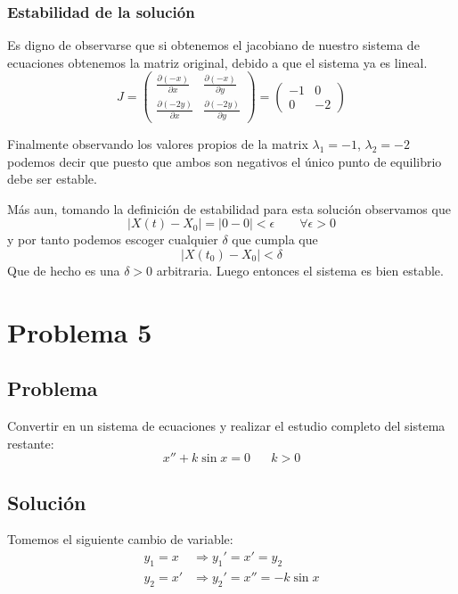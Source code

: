 \documentclass[10pt,letterpaper,titlepage]{article}
\begin{document}
\subsubsection{Estabilidad de la soluci\'on}

Es digno de observarse que si obtenemos el jacobiano de nuestro sistema de ecuaciones obtenemos la matriz original, debido a que el sistema ya es lineal.
\[
	J = \left(\begin{matrix}
		\frac{\partial (-x)}{\partial x} & \frac{\partial (-x)}{\partial y} \\
		\frac{\partial (-2y)}{\partial x} & \frac{\partial (-2y)}{\partial y}
	\end{matrix}\right) = \left(\begin{matrix}
		-1 & 0 \\
		0 & -2
	\end{matrix}\right)
\]

Finalmente observando los valores propios de la matrix $\lambda_1 = -1$, $\lambda_2 = -2$ podemos decir que puesto que ambos son negativos el único punto de equilibrio debe ser estable.

Más aun, tomando la definición de estabilidad para esta solución observamos que
\[
	|X(t) - X_0| = |0 - 0| < \epsilon \qquad \forall \epsilon>0
\]
y por tanto podemos escoger cualquier $\delta$ que cumpla que
\[
	|X(t_0) - X_0| < \delta
\]
Que de hecho es una $\delta>0$ arbitraria. Luego entonces el sistema es bien estable.

\section{Problema 5}

\subsection{Problema}
Convertir en un sistema de ecuaciones y realizar el estudio completo del sistema restante:
\begin{equation}
x'' + k \sin x = 0 \hspace{20pt} k>0
\end{equation}

\subsection{Solución}

Tomemos el siguiente cambio de variable:
\begin{equation}
	\begin{split}
		y_{1}=x & \Rightarrow y_{1}'=x'=y_{2} \\
		y_{2}=x' & \Rightarrow y_{2}'=x''= -k\sin x
	\end{split}
\end{equation}
\end{document}
